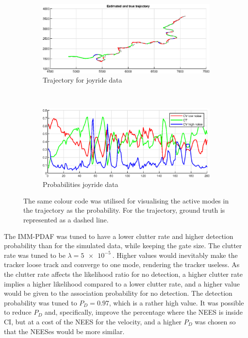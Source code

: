 \begin{figure}[ht]
    \centering
    \begin{subfigure}[h]{0.4\textwidth}
        \includegraphics[width=\textwidth]{figures/ga_1/joyride_estimated_trajectory}
        \caption{Trajectory for joyride data}
        \label{fig:ga_1_joyride_estimated_trajectory}
    \end{subfigure}%
    ~
    \begin{subfigure}[h]{0.4\textwidth}
        \includegraphics[width=\textwidth]{figures/ga_1/joyride_probs}
        \caption{Probabilities joyride data}
        \label{fig:ga_1_joyride_probabilities}
    \end{subfigure}
    \caption{The same colour code was utilised for visualising the active modes in the trajectory as the probability. For the trajectory, ground truth is represented as a dashed line. }
    \label{fig:ga_1_joyride_traj_and_probs} 
\end{figure}

The IMM-PDAF was tuned to have a lower clutter rate and higher detection probability than for the simulated data, while keeping the gate size. The clutter rate was tuned to be $\lambda = \SI{5e-5}{}$. Higher values would inevitably make the tracker loose track and converge to one mode, rendering the tracker useless. As the clutter rate affects the likelihood ratio for no detection, a higher clutter rate implies a higher likelihood compared to a lower clutter rate, and a higher value would be given to the association probability for no detection. The detection probability was tuned to $P_D = 0.97$, which is a rather high value. It was possible to reduce $P_D$ and, specifically, improve the percentage where the NEES is inside CI, but at a cost of the NEES for the velocity, and a higher $P_D$ was chosen so that the NEESes would be more similar. 


